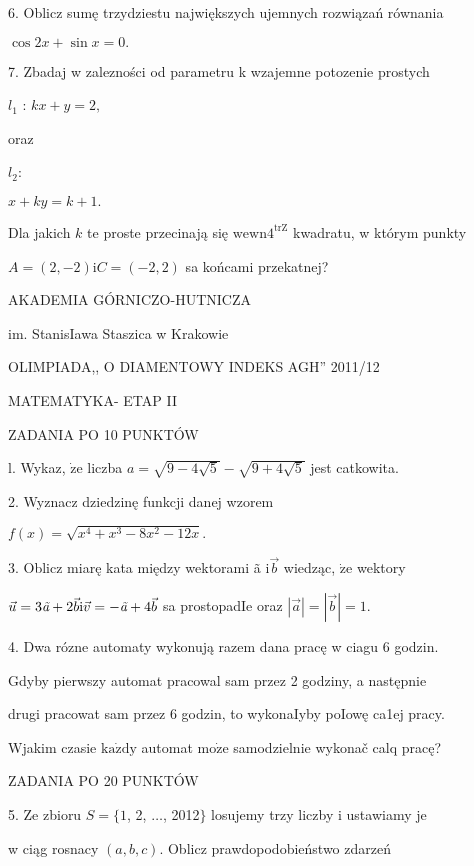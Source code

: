 \documentclass[a4paper,12pt]{article}
\begin{document}
6. Oblicz sumę trzydziestu największych ujemnych rozwiązań równania

$\cos 2x+\sin x=0.$

7. Zbadaj w zalezności od parametru k wzajemne potozenie prostych

$l_{1}$ : $kx+y=2,$

oraz

$l_{2}$:

$x+ky=k+1.$

Dla jakich $k$ te proste przecinają się $\mathrm{w}\mathrm{e}\mathrm{w}\mathrm{n}4^{\mathrm{t}\mathrm{r}\mathrm{Z}}$ kwadratu, w którym punkty

$A=(2,-2)\mathrm{i}C=(-2,2)$ sa końcami przekatnej?






AKADEMIA GÓRNICZO-HUTNICZA

im. StanisIawa Staszica w Krakowie

OLIMPIADA,, O DIAMENTOWY INDEKS AGH'' 2011/12

MATEMATYKA- ETAP II

ZADANIA PO 10 PUNKTÓW

l. Wykaz, $\dot{\mathrm{z}}\mathrm{e}$ liczba $a=\sqrt{9-4\sqrt{5}}-\sqrt{9+4\sqrt{5}}$ jest catkowita.

2. Wyznacz dziedzinę funkcji danej wzorem

$f(x)=\sqrt{x^{4}+x^{3}-8x^{2}-12x}.$

3. Oblicz miarę kata między wektorami ã $\mathrm{i} \vec{b}$ wiedząc, $\dot{\mathrm{z}}\mathrm{e}$ wektory

$\vec{u}=3\text{{\it ã}}+2\vec{b} \mathrm{i} \vec{v}=-\text{{\it ã}}+4\vec{b}$ sa prostopadIe oraz $|\vec{a}|=|\vec{b}|=1.$

4. Dwa rózne automaty wykonują razem dana pracę w ciagu 6 godzin.

Gdyby pierwszy automat pracowal sam przez 2 godziny, a następnie

drugi pracowat sam przez 6 godzin, to wykonaIyby poIowę ca1ej pracy.

Wjakim czasie $\mathrm{k}\mathrm{a}\dot{\mathrm{z}}\mathrm{d}\mathrm{y}$ automat $\mathrm{m}\mathrm{o}\dot{\mathrm{z}}\mathrm{e}$ samodzielnie wykonač calq pracę?

ZADANIA PO 20 PUNKTÓW

5. Ze zbioru $S = \{1$, 2, $\ldots$, 2012$\}$ losujemy trzy liczby i ustawiamy je

w ciąg rosnacy $(a,b,c)$. Oblicz prawdopodobieństwo zdarzeń
\end{document}
